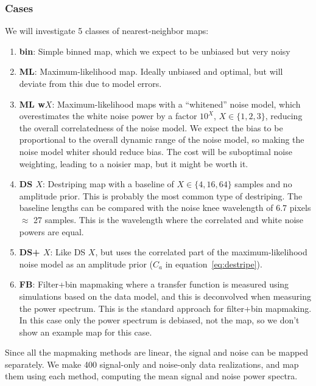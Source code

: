 \documentclass{aa}
\newcommand{\dfn}[1]{\textbf{#1}}
\begin{document}
\subsubsection{Cases}
\label{sec:2d-cases}
We will investigate 5 classes of nearest-neighbor maps:
\begin{enumerate}
	\item \dfn{bin}: Simple binned map, which we expect to be unbiased but very noisy
	\item \dfn{ML}: Maximum-likelihood map. Ideally unbiased and optimal, but will deviate
		from this due to model errors.
	\item \dfn{ML w$X$}: Maximum-likelihood maps with a ``whitened'' noise model,
		which overestimates the
		white noise power by a factor $10^X$, $X\in\{1,2,3\}$, reducing the overall
		correlatedness of the noise model. We expect the bias to be proportional to the
		overall dynamic range of the noise model,
		so making the noise model whiter should reduce bias. The cost will be suboptimal noise
		weighting, leading to a noisier map, but it might be worth it.
	\item \dfn{DS $X$}: Destriping map with a baseline of $X\in \{4,16,64\}$ samples and no amplitude
		prior. This is probably the most common type of destriping. The baseline lengths
		can be compared with the noise knee wavelength of 6.7 pixels $\approx$ 27 samples.
		This is the wavelength where the correlated and white noise powers are equal.
	\item \dfn{DS+ $X$}: Like DS $X$, but uses the correlated part of the maximum-likelihood
		noise model as an amplitude prior ($C_a$ in equation~\ref{eq:destripe}).
	\item \dfn{FB}: Filter+bin mapmaking where a transfer function is measured using
		simulations based on the data model, and this is deconvolved when measuring
		the power spectrum. This is the standard approach for filter+bin mapmaking.
		In this case only the power spectrum is debiased, not the map, so we don't
		show an example map for this case.
\end{enumerate}

Since all the mapmaking methods are linear, the signal and noise can be mapped separately.
We make 400 signal-only and noise-only data realizations, and map them using each method,
computing the mean signal and noise power spectra.
\end{document}
